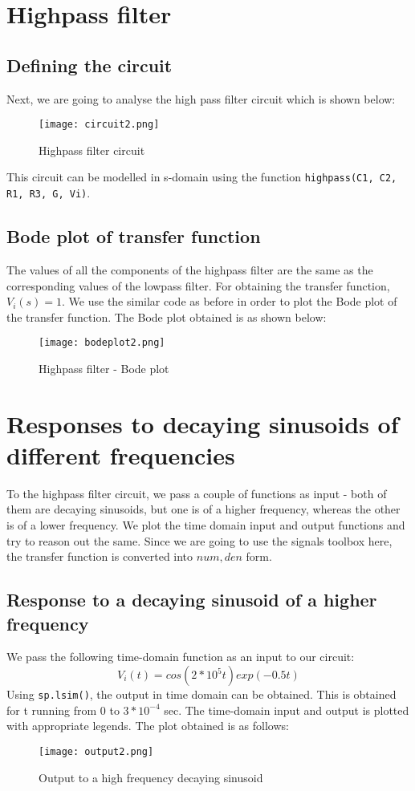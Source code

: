 \documentclass[11pt, a4paper]{article}
\begin{document}
\section{Highpass filter}
\subsection{Defining the circuit}
Next, we are going to analyse the high pass filter circuit which is shown below:
\begin{figure}[H]
\centering
  \texttt{[image: circuit2.png]}  
\caption{Highpass filter circuit}
\end{figure}
This circuit can be modelled in s-domain using the function \texttt{highpass(C1, C2, R1, R3, G, Vi)}.

\subsection{Bode plot of transfer function}
The values of all the components of the highpass filter are the same as the corresponding values of the lowpass filter. For obtaining the transfer function, \(V_i(s) = 1\). We use the similar code as before in order to plot the Bode plot of the transfer function. The Bode plot obtained is as shown below:
\begin{figure}[H]
\centering
  \texttt{[image: bodeplot2.png]}  
\caption{Highpass filter - Bode plot}
\end{figure}

\section{Responses to decaying sinusoids of different frequencies}
To the highpass filter circuit, we pass a couple of functions as input - both of them are decaying sinusoids, but one is of a higher frequency, whereas the other is of a lower frequency. We plot the time domain input and output functions and try to reason out the same. Since we are going to use the signals toolbox here, 
the transfer function is converted into \(num, den\) form.

\subsection{Response to a decaying sinusoid of a higher frequency}
We pass the following time-domain function as an input to our circuit:
\[V_i(t) = cos(2*10^5t)exp(-0.5t)\]
Using \texttt{sp.lsim()}, the output in time domain can be obtained. This is obtained for t running from 0 to \(3*10^{-4}\) sec. The time-domain input and output is plotted with appropriate legends. The plot obtained is as follows:
\begin{figure}[H]
\centering
  \texttt{[image: output2.png]}  
\caption{Output to a high frequency decaying sinusoid}
\end{figure}
\end{document}
